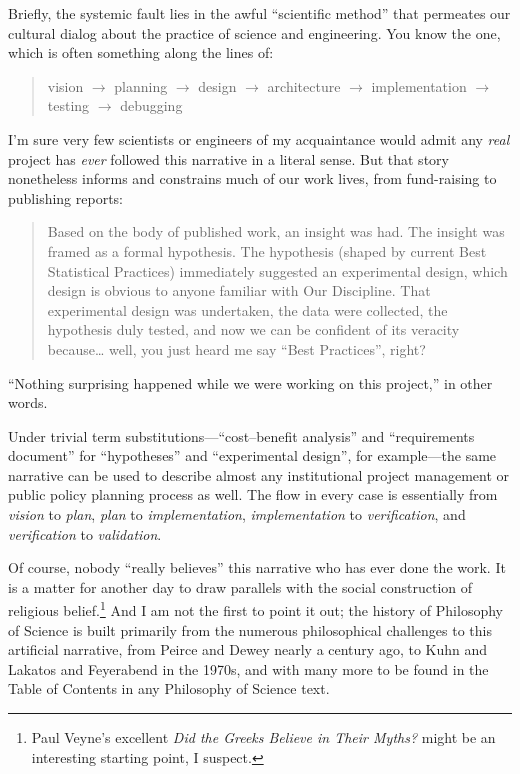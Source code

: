 Briefly, the systemic fault lies in the awful ``scientific method'' that permeates our cultural dialog about the practice of science and engineering. You know the one, which is often something along the lines of:

\begin{quote}
vision $\rightarrow$ planning $\rightarrow$ design $\rightarrow$ architecture $\rightarrow$ implementation $\rightarrow$ testing $\rightarrow$ debugging
\end{quote}

I'm sure very few scientists or engineers of my acquaintance would admit any \emph{real} project has \emph{ever} followed this narrative in a literal sense. But that story nonetheless informs and constrains much of our work lives, from fund-raising to publishing reports:

\begin{quote}
Based on the body of published work, an insight was had. The insight was framed as a formal hypothesis. The hypothesis (shaped by current Best Statistical Practices) immediately suggested an experimental design, which design is obvious to anyone familiar with Our Discipline. That experimental design was undertaken, the data were collected, the hypothesis duly tested, and now we can be confident of its veracity because\ldots{} well, you just heard me say ``Best  Practices'', right?
\end{quote}

``Nothing surprising happened while we were working on this project,'' in other words.

Under trivial term substitutions---``cost--benefit analysis'' and ``requirements document'' for ``hypotheses'' and ``experimental design'', for example---the same narrative can be used to describe almost any institutional project management or public policy planning process as well. The flow in every case is essentially from \emph{vision} to \emph{plan}, \emph{plan} to \emph{implementation}, \emph{implementation} to \emph{verification}, and \emph{verification} to \emph{validation}.

Of course, nobody ``really believes'' this narrative who has ever done the work. It is a matter for another day to draw parallels with the social construction of religious belief.\footnote{Paul Veyne's excellent \emph{Did the Greeks Believe in Their Myths?} might be an interesting starting point, I suspect.} And I am not the first to point it out; the history of Philosophy of Science is built primarily from the numerous philosophical challenges to this artificial narrative, from Peirce and Dewey nearly a century ago, to Kuhn and Lakatos and Feyerabend in the 1970s, and with many more to be found in the Table of Contents in any Philosophy of Science text.

